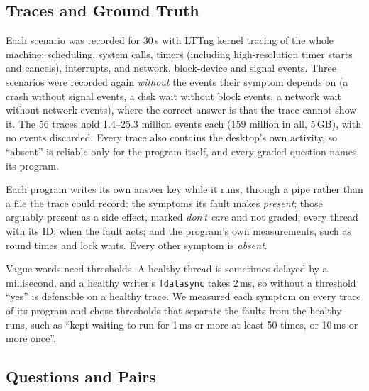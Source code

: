 \subsection{Traces and Ground Truth}

Each scenario was recorded for 30\,s with LTTng kernel tracing of the whole machine: scheduling, system calls, timers (including high-resolution timer starts and cancels), interrupts, and network, block-device and signal events. Three scenarios were recorded again \emph{without} the events their symptom depends on (a crash without signal events, a disk wait without block events, a network wait without network events), where the correct answer is that the trace cannot show it. The 56 traces hold 1.4--25.3 million events each (159 million in all, 5\,GB), with no events discarded. Every trace also contains the desktop's own activity, so ``absent'' is reliable only for the program itself, and every graded question names its program.

Each program writes its own answer key while it runs, through a pipe rather than a file the trace could record: the symptoms its fault makes \emph{present}; those arguably present as a side effect, marked \emph{don't care} and not graded; every thread with its ID; when the fault acts; and the program's own measurements, such as round times and lock waits. Every other symptom is \emph{absent}.

Vague words need thresholds. A healthy thread is sometimes delayed by a millisecond, and a healthy writer's \texttt{fdatasync} takes 2\,ms, so without a threshold ``yes'' is defensible on a healthy trace. We measured each symptom on every trace of its program and chose thresholds that separate the faults from the healthy runs, such as ``kept waiting to run for 1\,ms or more at least 50 times, or 10\,ms or more once''.

\subsection{Questions and Pairs}


